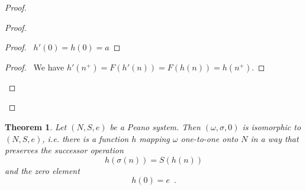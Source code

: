 \documentclass{article}
\let\qed\relax
\newtheorem{theorem}[axiom]{Theorem}
\theoremstyle{definition}
\begin{document}
\begin{proof}
\begin{proof}
            \begin{proof}
                \pf\ $h'(0) = h(0) = a$
            \end{proof}
            \begin{proof}
                \pf\ We have $h'(n^+) = F(h'(n)) = F(h(n)) = h(n^+)$.
            \end{proof}
        \end{proof}
        \qed
    \end{proof}

    \begin{theorem}
        Let $(N,S,e)$ be a Peano system. Then $(\omega, \sigma, 0)$ is isomorphic to $(N,S,e)$, i.e. there is
        a function $h$ mapping $\omega$ one-to-one onto $N$ in a way that preserves the successor operation
        \[ h(\sigma(n)) = S(h(n)) \]
        and the zero element
        \[ h(0) = e \enspace . \]
    \end{theorem}
\end{document}
